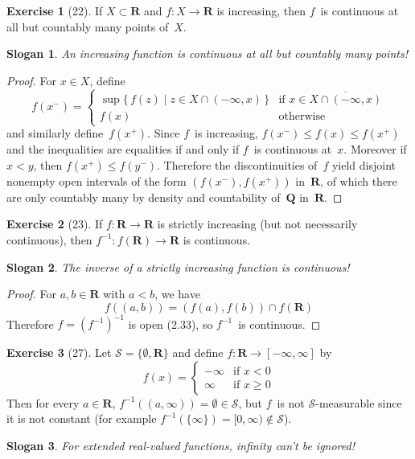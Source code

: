 \documentclass[letterpaper,12pt]{article}
\newcommand{\Q}{\mathbf{Q}}
\newcommand{\R}{\mathbf{R}}
\renewcommand{\S}{\mathcal{S}}
\newcommand{\sect}{\cap}
\newcommand{\inv}[1]{#1^{-1}}
\newcommand{\closure}[1]{\overline{#1}}
\theoremstyle{definition}
\newtheorem*{exer}{Exercise}
\theoremstyle{remark}
\theoremstyle{plain}
\newtheorem*{slogan}{Slogan}
\begin{document}
\begin{exer}[22]
If \(X\subset\R\) and \(f:X\to\R\) is increasing, then \(f\)~is continuous at all but countably many points of~\(X\).
\end{exer}
\begin{slogan}
An increasing function is continuous at all but countably many points!
\end{slogan}
\begin{proof}
For \(x\in X\), define
\[f(x^-)=\begin{cases}
\sup\{\,f(z)\mid z\in X\sect(-\infty,x)\,\}&\text{if }x\in\closure{X\sect(-\infty,x)}\\
f(x)&\text{otherwise}
\end{cases}\]
and similarly define~\(f(x^+)\). Since \(f\)~is increasing, \(f(x^-)\le f(x)\le f(x^+)\) and the inequalities are equalities if and only if \(f\)~is continuous at~\(x\). Moreover if \(x<y\), then \(f(x^+)\le f(y^-)\). Therefore the discontinuities of~\(f\) yield disjoint nonempty open intervals of the form \((f(x^-),f(x^+))\) in~\(\R\), of which there are only countably many by density and countability of~\(\Q\) in~\(\R\).
\end{proof}

\begin{exer}[23]
If \(f:\R\to\R\) is strictly increasing (but not necessarily continuous), then \(\inv{f}:f(\R)\to\R\) is continuous.
\end{exer}
\begin{slogan}
The inverse of a strictly increasing function is continuous!
\end{slogan}
\begin{proof}
For \(a,b\in\R\) with \(a<b\), we have
\[f((a,b))=(f(a),f(b))\sect f(\R)\]
Therefore \(f=\inv{(\inv{f})}\) is open (2.33), so \(\inv{f}\)~is continuous.
\end{proof}

\begin{exer}[27]
Let \(\S=\{\emptyset,\R\}\) and define \(f:\R\to[-\infty,\infty]\) by
\[f(x)=\begin{cases}
-\infty&\text{if }x<0\\
\infty&\text{if }x\ge0
\end{cases}\]
Then for every \(a\in\R\), \(\inv{f}((a,\infty))=\emptyset\in\S\), but \(f\)~is not \(\S\)-measurable since it is not constant (for example \(\inv{f}(\{\infty\})=[0,\infty)\not\in\S\)).
\end{exer}
\begin{slogan}
For extended real-valued functions, infinity can't be ignored!
\end{slogan}
\end{document}
